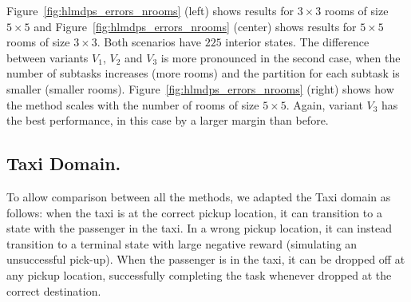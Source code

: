 Figure~\ref{fig:hlmdps_errors_nrooms} (left) shows results for $3\times 3$ rooms of size $5\times 5$ and Figure~\ref{fig:hlmdps_errors_nrooms} (center) shows results for $5\times 5$ rooms of size $3\times 3$. Both scenarios have $225$ interior states.
The difference between variants $V_1$, $V_2$ and $V_3$ is more pronounced in the second case, when the number of subtasks increases (more rooms) and the partition for each subtask is smaller (smaller rooms). Figure~\ref{fig:hlmdps_errors_nrooms} (right) shows how the method scales with the number of rooms of size $5\times 5$.
Again, variant $V_3$ has the best performance, in this case by a larger 
margin than before.








\subsection{Taxi Domain.}
To allow comparison between all the methods, we adapted the Taxi domain as follows: when the taxi is at the correct pickup location, it can transition to a state with the passenger in the taxi.
In a wrong pickup location, it can instead transition to a terminal state with large negative reward (simulating an unsuccessful pick-up).
When the passenger is in the taxi, it can be dropped off at any pickup location, successfully completing the task whenever dropped at the correct destination.

